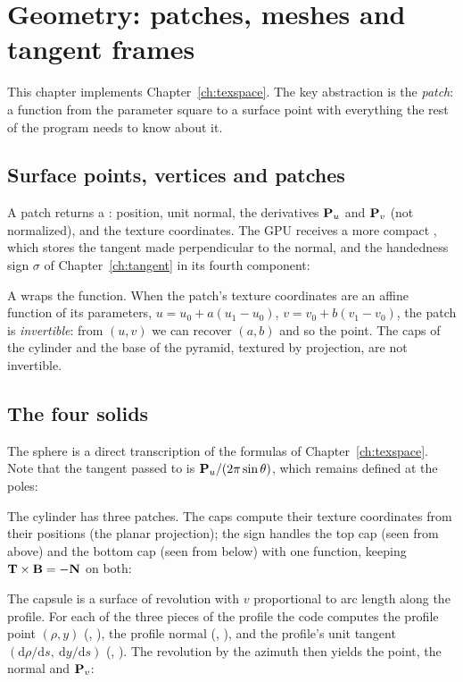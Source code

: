 \chapter{Geometry: patches, meshes and tangent frames}
\label{ch:geometry}

This chapter implements Chapter~\ref{ch:texspace}. The key abstraction is the \emph{patch}: a
function from the parameter square to a surface point with everything the rest of the program
needs to know about it.

\section{Surface points, vertices and patches}

A patch returns a : position, unit normal, the derivatives
$\mathbf{P}_u$ and $\mathbf{P}_v$ (not normalized), and the texture coordinates. The GPU receives a
more compact , which stores the tangent made perpendicular to the normal, and the
handedness sign $\sigma$ of Chapter~\ref{ch:tangent} in its fourth component:


A  wraps the function. When the patch's texture coordinates are an affine function of
its parameters, $u = u_0 + a(u_1-u_0)$, $v=v_0+b(v_1-v_0)$, the patch is \emph{invertible}: from
$(u,v)$ we can recover $(a,b)$ and so the point. The caps of the cylinder and the base of the
pyramid, textured by projection, are not invertible.


\section{The four solids}

The sphere is a direct transcription of the formulas of Chapter~\ref{ch:texspace}. Note that the
tangent passed to  is $\mathbf{P}_u/(2\pi\sin\theta)$, which remains defined at the
poles:


The cylinder has three patches. The caps compute their texture coordinates from their positions
(the planar projection); the sign  handles the top cap (seen from above) and the bottom
cap (seen from below) with one function, keeping $\mathbf{T}\times\mathbf{B}=-\mathbf{N}$ on both:


The capsule is a surface of revolution with $v$ proportional to arc length along the profile.
For each of the three pieces of the profile the code computes the profile point
$(\rho,y)$ (, ), the profile normal (, ), and the
profile's unit tangent $(\mathrm d\rho/\mathrm ds,\ \mathrm dy/\mathrm ds)$ (,
). The revolution by the azimuth then yields the point, the normal and $\mathbf{P}_v$:

